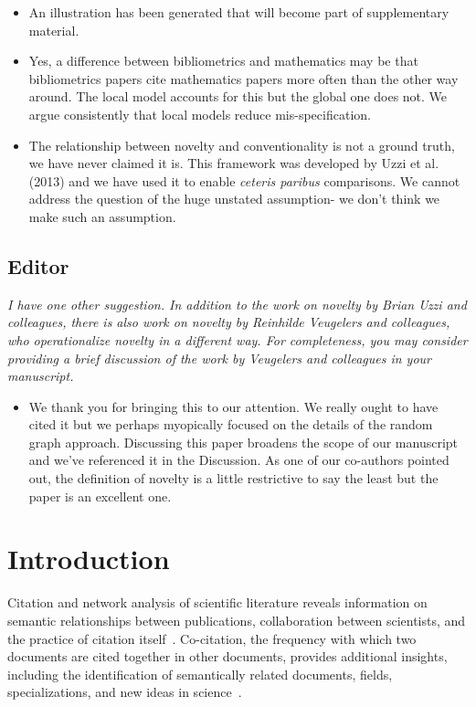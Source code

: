 \documentclass[NETN]{stjour}
\begin{document}
\begin{itemize}
\item An illustration has been generated that will become part of supplementary material.
\item Yes, a difference between bibliometrics and mathematics may be that bibliometrics papers cite mathematics papers more often than the other way around. The local model accounts for this but the global one does not. We argue consistently that local models reduce mis-specification.
\item The relationship between novelty and conventionality is not a ground truth, we have never claimed it is. This framework was developed by Uzzi et al. (2013) and we have used it to enable \emph{ceteris paribus} comparisons. We cannot address the question of the huge unstated assumption- we don't think we make such an assumption.
\end{itemize}

\subsection{Editor}
\emph{I have one other suggestion. In addition to the work on novelty by Brian Uzzi and colleagues, there is also work on novelty by Reinhilde Veugelers and colleagues, who operationalize novelty in a different way. For completeness, you may consider providing a brief discussion of the work by Veugelers and colleagues in your manuscript.}
\begin{itemize}
\item We thank you for bringing this to our attention. We really ought to have cited it but we perhaps myopically focused on the details of the random graph approach. Discussing this paper broadens the scope of our manuscript and we've referenced it in the Discussion. As one of our co-authors pointed out, the definition of novelty is a little restrictive to say the least but the paper is an excellent one. \end{itemize}

\section{Introduction}

Citation and network analysis of  scientific literature reveals information on semantic relationships between publications, collaboration between scientists, and the practice of citation itself~\citep{garfield_citation_1955,de_solla_price_networks_1965,newman_structure_2001,Shi:2010:CHI:1816123.1816131,patience_pmid28560354,stigler_1994}. Co-citation, the frequency with which two documents are cited together in other documents, provides additional insights, including the identification of semantically related documents, fields, specializations, and new ideas in science~\citep{small_co-citation_1973, marshakova-shaikevich_co-citation_1973,boyack_co-citation_2010, 10.3389/frma.2018.00020}.  
\end{document}

